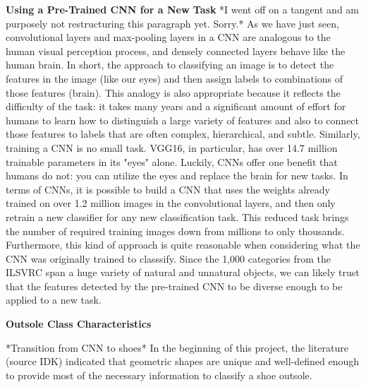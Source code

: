 \documentclass{article}\usepackage[]{graphicx}\usepackage[]{color}
\begin{document}
\textbf{Using a Pre-Trained CNN for a New Task}
*I went off on a tangent and am purposely not restructuring this paragraph yet. Sorry.*
As we have just seen, convolutional layers and max-pooling layers in a CNN are analogous to the human visual perception process, and densely connected layers behave like the human brain. In short, the approach to classifying an image is to detect the features in the image (like our eyes) and then assign labels to combinations of those features (brain). This analogy is also appropriate because it reflects the difficulty of the task: it takes many years and a significant amount of effort for humans to learn how to distinguish a large variety of features and also to connect those features to labels that are often complex, hierarchical, and subtle. Similarly, training a CNN is no small task. VGG16, in particular, has over 14.7 million trainable parameters in its "eyes" alone. Luckily, CNNs offer one benefit that humans do not: you can utilize the eyes and replace the brain for new tasks. In terms of CNNs, it is possible to build a CNN that uses the weights already trained on over 1.2 million images in the convolutional layers, and then only retrain a new classifier for any new classification task. This reduced task brings the number of required training images down from millions to only thousands. Furthermore, this kind of approach is quite reasonable when considering what the CNN was originally trained to classsify. Since the 1,000 categories from the ILSVRC span a huge variety of natural and unnatural objects, we can likely trust that the features detected by the pre-trained CNN to be diverse enough to be applied to a new task.

\textbf{Outsole Class Characteristics}

*Transition from CNN to shoes* In the beginning of this project, the literature (source IDK) indicated that geometric shapes are unique and well-defined enough to provide most of the necessary information to classify a shoe outsole. 
\end{document}
